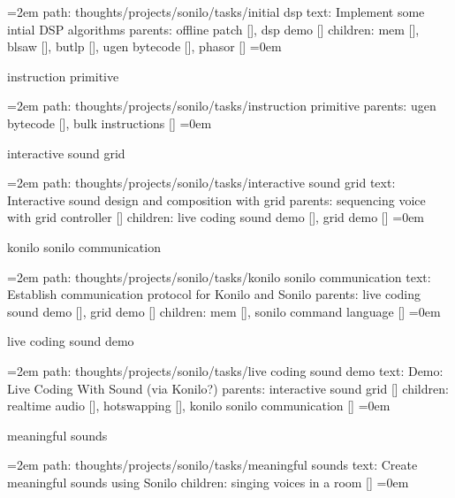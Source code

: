 \leftskip=2em
path: thoughts/projects/sonilo/tasks/initial dsp
\smallskip
text:  Implement some intial DSP algorithms
\smallskip
parents:  offline patch [], dsp demo []
\smallskip
children: mem [], blsaw [], butlp [], ugen bytecode [], phasor []
\smallskip
\leftskip=0em
\par\endgroup
\bigskip
{}
instruction primitive
\smallskip
\par\begingroup
\leftskip=2em
path: thoughts/projects/sonilo/tasks/instruction primitive
\smallskip
parents:  ugen bytecode [], bulk instructions []
\smallskip
\leftskip=0em
\par\endgroup
\bigskip
{}
interactive sound grid
\smallskip
\par\begingroup
\leftskip=2em
path: thoughts/projects/sonilo/tasks/interactive sound grid
\smallskip
text:  Interactive sound design and composition with grid
\smallskip
parents:  sequencing voice with grid controller []
\smallskip
children: live coding sound demo [], grid demo []
\smallskip
\leftskip=0em
\par\endgroup
\bigskip
{}
konilo sonilo communication
\smallskip
\par\begingroup
\leftskip=2em
path: thoughts/projects/sonilo/tasks/konilo sonilo communication
\smallskip
text:  Establish communication protocol for Konilo and Sonilo
\smallskip
parents:  live coding sound demo [], grid demo []
\smallskip
children: mem [], sonilo command language []
\smallskip
\leftskip=0em
\par\endgroup
\bigskip
{}
live coding sound demo
\smallskip
\par\begingroup
\leftskip=2em
path: thoughts/projects/sonilo/tasks/live coding sound demo
\smallskip
text:  Demo: Live Coding With Sound (via Konilo?)
\smallskip
parents:  interactive sound grid []
\smallskip
children: realtime audio [], hotswapping [], konilo sonilo communication []
\smallskip
\leftskip=0em
\par\endgroup
\bigskip
{}
meaningful sounds
\smallskip
\par\begingroup
\leftskip=2em
path: thoughts/projects/sonilo/tasks/meaningful sounds
\smallskip
text:  Create meaningful sounds using Sonilo
\smallskip
children: singing voices in a room []
\smallskip
\leftskip=0em
\par\endgroup
